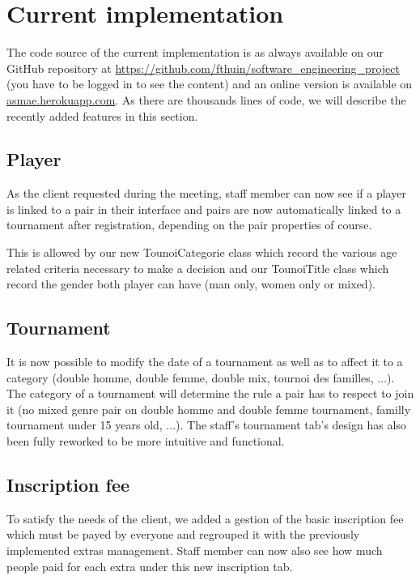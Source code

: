 \section{Current implementation}

The code source of the current implementation is as always available on our GitHub repository at \url{https://github.com/fthuin/software_engineering_project} (you have to be logged in to see the content) and an online version is available on \url{asmae.herokuapp.com}. As there are thousands lines of code, we will describe the recently added features in this section.

\subsection{Player}

As the client requested during the meeting, staff member can now see if a player is linked to a pair in their interface and pairs are now automatically linked to a tournament after registration, depending on the pair properties of course.

This is allowed by our new TounoiCategorie class which record the various age related criteria necessary to make a decision and our TounoiTitle class which record the gender both player can have (man only, women only or mixed).

\subsection{Tournament}

It is now possible to modify the date of a tournament as well as to affect it to a category (double homme, double femme, double mix, tournoi des familles, ...). The category of a tournament will determine the rule a pair has to respect to join it (no mixed genre pair on double homme and double femme tournament, familly tournament under 15 years old, ...). The staff's tournament tab's design has also been fully reworked to be more intuitive and functional.

\subsection{Inscription fee}

To satisfy the needs of the client, we added a gestion of the basic inscription fee which must be payed by everyone and regrouped it with the previously implemented extras management. Staff member can now also see how much people paid for each extra under this new inscription tab.

